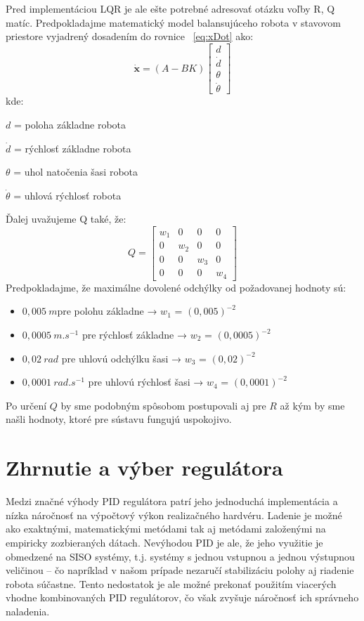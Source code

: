 Pred implementáciou LQR je ale ešte potrebné adresovať otázku voľby R, Q matíc. Predpokladajme matematický model balansujúceho robota v stavovom priestore vyjadrený dosadením do rovnice \figurename~\ref{eq:xDot} ako:
\begin{equation}
\dot {\textbf {x}} = (A - BK) \begin{bmatrix}
d \\
\dot{d} \\
\theta \\
\dot{\theta} 
\end{bmatrix}
\end{equation}
kde: 

\quad $d$ = poloha základne robota 

\quad $\dot{d}$ = rýchlosť  základne robota 

\quad $\theta$ = uhol natočenia šasi robota 

\quad $\dot{\theta}$ = uhlová rýchlosť robota

Ďalej uvažujeme Q také, že:
\begin{equation}
Q = \begin{bmatrix}
w_1 & 0 & 0 & 0 \\
0 & w_2 & 0 & 0 \\
0 & 0 & w_3 & 0 \\
0 & 0 & 0 & w_4
\end{bmatrix}
\end{equation}
\newline
Predpokladajme, že maximálne dovolené odchýlky od požadovanej hodnoty sú:
\begin{itemize}
\item $0,005~m $pre polohu základne → $w_1$ = $(0,005)^{-2}$
\item $0,0005~m.s^{-1}$ pre rýchlosť základne → $w_2$ = $(0,0005)^{-2}$
\item $0,02~rad$ pre uhlovú odchýlku šasi → $w_3$ = $(0,02)^{-2}$
\item $0,0001~rad.s^{-1}$ pre uhlovú rýchlosť šasi → $w_4$ = $(0,0001)^{-2}$
\end{itemize}

Po určení $Q$ by sme podobným spôsobom postupovali aj pre $R$ až kým by sme našli hodnoty, ktoré pre sústavu fungujú uspokojivo. 

\section{Zhrnutie a výber regulátora}
Medzi značné výhody PID regulátora patrí jeho jednoduchá implementácia a nízka náročnosť na výpočtový výkon realizačného hardvéru. Ladenie je možné ako exaktnými, matematickými metódami tak aj metódami založenými na empiricky zozbieraných dátach. Nevýhodou PID je ale,  že jeho využitie je obmedzené na \ac{SISO} systémy, t.j. systémy s jednou vstupnou a jednou výstupnou veličinou – čo napríklad v našom prípade nezaručí stabilizáciu polohy aj riadenie robota súčastne. Tento nedostatok je ale možné prekonať použitím viacerých vhodne kombinovaných PID regulátorov, čo však zvyšuje náročnosť ich správneho naladenia.

